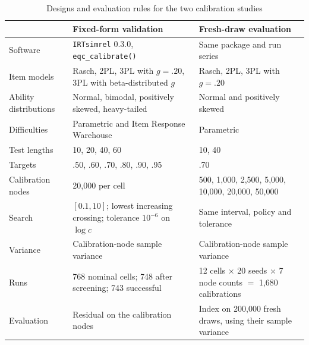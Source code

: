 \begin{table}[!htb]
\centering
\caption{Designs and evaluation rules for the two calibration studies}
\label{tab:app-blocks}
\footnotesize
\setlength{\tabcolsep}{5pt}
\begin{tabularx}{\textwidth}{@{}>{\raggedright\arraybackslash}p{}XX@{}}
\toprule
 & Fixed-form validation & Fresh-draw evaluation \\
\midrule
Software & \texttt{IRTsimrel} 0.3.0, \texttt{eqc\_calibrate()} & Same package and run series \\
Item models & Rasch, 2PL, 3PL with $g=.20$, 3PL with beta-distributed $g$ & Rasch, 2PL, 3PL with $g=.20$ \\
Ability distributions & Normal, bimodal, positively skewed, heavy-tailed & Normal and positively skewed \\
Difficulties & Parametric and Item Response Warehouse & Parametric \\
Test lengths & 10, 20, 40, 60 & 10, 40 \\
Targets & .50, .60, .70, .80, .90, .95 & .70 \\
Calibration nodes & 20,000 per cell & 500, 1,000, 2,500, 5,000, 10,000, 20,000, 50,000 \\
Search & $[0.1,10]$; lowest increasing crossing; tolerance $10^{-6}$ on $\log c$ & Same interval, policy and tolerance \\
Variance & Calibration-node sample variance & Calibration-node sample variance \\
Runs & 768 nominal cells; 748 after screening; 743 successful & 12 cells $\times$ 20 seeds $\times$ 7 node counts $=$ 1,680 calibrations \\
Evaluation & Residual on the calibration nodes & Index on 200,000 fresh draws, using their sample variance \\
\bottomrule
\end{tabularx}
\end{table}
